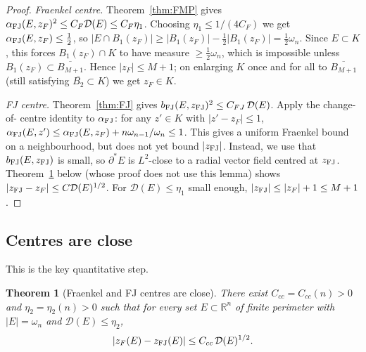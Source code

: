 \documentclass[11pt]{article}
\newtheorem{theorem}{Theorem}[section]
\theoremstyle{definition}
\newcommand{\R}{\mathbb{R}}
\newcommand{\dD}{\mathcal D}
\newcommand{\alphaFJ}{\alpha_{\rm FJ}}
\newcommand{\bFJ}{b_{\rm FJ}}
\begin{document}
\begin{proof}
\emph{Fraenkel centre.}  Theorem~\ref{thm:FMP} gives
\(\alphaFJ(E,z_F)^{2}\le C_F\dD(E)\le C_F\eta_{1}\).  Choosing
\(\eta_{1}\le 1/(4C_F)\) we get \(\alphaFJ(E,z_F)\le\tfrac12\), so
\(|E\cap B_1(z_F)|\ge|B_1(z_F)|-\tfrac12|B_1(z_F)|=\tfrac12\omega_n\).
Since \(E\subset K\), this forces \(B_1(z_F)\cap K\) to have measure
\(\ge\tfrac12\omega_n\), which is impossible unless
\(B_1(z_F)\subset\overline{B_{M+1}}\).  Hence \(|z_F|\le M+1\); on
enlarging \(K\) once and for all to \(\overline{B_{M+1}}\) (still
satisfying \(\overline{B_{2}}\subset K\)) we get \(z_F\in K\).

\emph{FJ centre.}  Theorem~\ref{thm:FJ} gives
\(\bFJ(E,z_{\rm FJ})^{2}\le C_{FJ}\,\dD(E)\).  Apply the change-of-
centre identity to \(\alphaFJ\): for any \(z'\in K\) with
\(|z'-z_F|\le 1\),
\(\alphaFJ(E,z')\le\alphaFJ(E,z_F)+n\omega_{n-1}/\omega_n\le 1\).
This gives a uniform Fraenkel bound on a neighbourhood, but does not
yet bound \(|z_{\rm FJ}|\).  Instead, we use that
\(\bFJ(E,z_{\rm FJ})\) is small, so \(\partial^{\ast}E\) is
\(L^{2}\)-close to a radial vector field centred at \(z_{\rm FJ}\).
Theorem~\ref{thm:centres-close} below (whose proof does not use
this lemma) shows
\(|z_{\rm FJ}-z_F|\le C\dD(E)^{1/2}\).  For
\(\dD(E)\le\eta_{1}\) small enough,
\(|z_{\rm FJ}|\le|z_F|+1\le M+1\).
\end{proof}

\subsection{Centres are close}

This is the key quantitative step.

\begin{theorem}[Fraenkel and FJ centres are close]\label{thm:centres-close}
There exist \(C_{cc}=C_{cc}(n)>0\) and \(\eta_{2}=\eta_{2}(n)>0\) such
that for every set \(E\subset\R^{n}\) of finite perimeter with
\(|E|=\omega_n\) and \(\dD(E)\le\eta_{2}\),
\[
   |z_F(E)-z_{\rm FJ}(E)|\le C_{cc}\,\dD(E)^{1/2}.
\]
\end{theorem}
\end{document}
